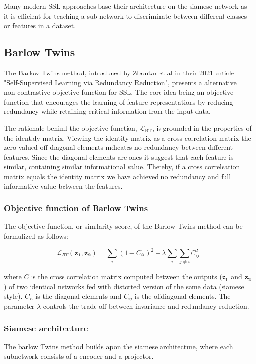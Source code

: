 Many modern SSL approaches base their architecture on the siamese network as it is efficient for teaching a sub network to discriminate between different classes or features in a dataset. 


\subsection{Barlow Twins}
The Barlow Twins method, introduced by Zbontar et al in their 2021 article "Self-Supervised Learning via Redundancy Reduction"\cite{Barlow}, presents a alternative non-contrastive objective function for SSL. The core idea being an objective function that encourages the learning of feature representations
by reducing redundancy while retaining critical information from the input data. 

The rationale behind the objective function, $\mathcal{L}_{\text{BT}}$, is grounded in the properties of the identidy matrix. Viewing the identity matrix as a cross correlation matrix the zero valued off diagonal elements indicates no redundancy between different features. Since the diagonal elements are ones it suggest that each feature is similar, containing similar informational value.
Thereby, if a cross correleation matrix equals the identity matrix we have achieved no redundancy and full informative value between the features.

\subsubsection{Objective function of Barlow Twins}
The objective function, or similarity score, of the Barlow Twins method can be formulized as follows:

\begin{equation}
\mathcal{L}_{BT}(\mathbf{z_1}, \mathbf{z_2}) = \sum_i (1 - C_{ii})^2 + \lambda \sum_i \sum_{j \neq i} C_{ij}^2
\end{equation}

where $C$ is the cross correlation matrix computed between the outputs ($\mathbf{z_1}$ and $\mathbf{z_2}$) of two identical networks fed with distorted version of the same data (siamese style). $C_{ii}$ is the diagonal elements and $C_{ij}$ is the offdiagonal elements.
The parameter $\lambda$ controls the trade-off between invariance and redundancy reduction.

\subsubsection{Siamese architecture}
The barlow Twins method builds apon the siamese architecture, where each subnetwork consists of a encoder and a projector.

